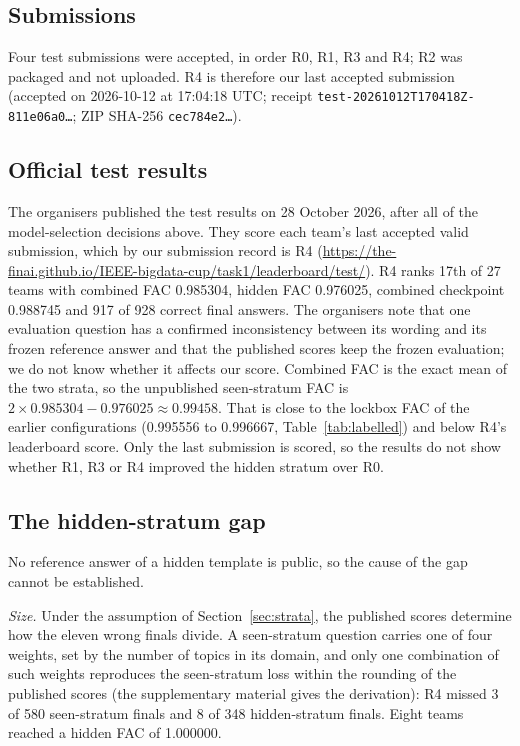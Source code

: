 \documentclass[conference]{IEEEtran}
\newcommand{\id}[1]{\texttt{#1}}
\begin{document}
\subsection{Submissions}
Four test submissions were accepted, in order R0, R1, R3 and R4; R2 was packaged and not uploaded. R4 is therefore our last accepted submission (accepted on 2026-10-12 at 17:04:18 UTC; receipt \id{test-20261012T170418Z-811e06a0\ldots}; ZIP SHA-256 \id{cec784e2\ldots}).

\subsection{Official test results}\label{sec:test}
The organisers published the test results on 28 October 2026, after all of the model-selection decisions above. They score each team's last accepted valid submission, which by our submission record is R4 (\url{https://the-finai.github.io/IEEE-bigdata-cup/task1/leaderboard/test/}). R4 ranks 17th of 27 teams with combined FAC 0.985304, hidden FAC 0.976025, combined checkpoint 0.988745 and 917 of 928 correct final answers. The organisers note that one evaluation question has a confirmed inconsistency between its wording and its frozen reference answer and that the published scores keep the frozen evaluation; we do not know whether it affects our score. Combined FAC is the exact mean of the two strata, so the unpublished seen-stratum FAC is $2\times0.985304-0.976025\approx0.99458$. That is close to the lockbox FAC of the earlier configurations (0.995556 to 0.996667, Table~\ref{tab:labelled}) and below R4's leaderboard score. Only the last submission is scored, so the results do not show whether R1, R3 or R4 improved the hidden stratum over R0.

\subsection{The hidden-stratum gap}\label{sec:hidden}
No reference answer of a hidden template is public, so the cause of the gap cannot be established.

\emph{Size.} Under the assumption of Section~\ref{sec:strata}, the published scores determine how the eleven wrong finals divide. A seen-stratum question carries one of four weights, set by the number of topics in its domain, and only one combination of such weights reproduces the seen-stratum loss within the rounding of the published scores (the supplementary material gives the derivation): R4 missed 3 of 580 seen-stratum finals and 8 of 348 hidden-stratum finals. Eight teams reached a hidden FAC of 1.000000.
\end{document}
